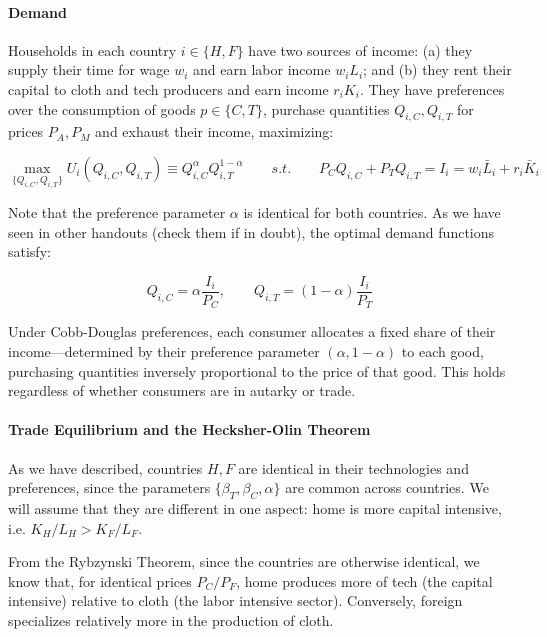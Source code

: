 \documentclass[11pt,letterpaper]{article}
\begin{document}
\paragraph{Demand} Households in each country $i \in \{H,F\}$ have two sources of income: (a) they supply their time for wage $w_i$ and earn labor income $w_i L_i$; and (b) they rent their capital to cloth and tech producers and earn income $r_{i} K_{i}$. They have preferences over the consumption of goods $p \in \{ C, T\}$, purchase quantities $Q_{i,C}, Q_{i,T}$ for prices $P_{A}, P_{M}$ and exhaust their income, maximizing:

\begin{equation*}
    \max_{\{Q_{i,C}, Q_{i,T}\}} U_i(Q_{i,C}, Q_{i,T}) \equiv Q_{i,C}^{\alpha} Q_{i,T}^{1-\alpha} \qquad s.t. \qquad P_{C} Q_{i,C} + P_{T} Q_{i,T} = I_i = w_i \bar{L}_i + r_{i} \bar{K}_{i}
\end{equation*}

Note that the preference parameter $\alpha$ is identical for both countries. As we have seen in other handouts (check them if in doubt), the optimal demand functions satisfy:

\begin{equation}\label{eq: demand}
    Q_{i,C} = \alpha  \frac{I_i}{P_{C}}, \qquad Q_{i,T} = (1-\alpha) \frac{I_i}{P_{T}}
\end{equation}
\normalsize

Under Cobb-Douglas preferences, each consumer allocates a fixed share of their income—determined by their preference parameter $(\alpha, 1-\alpha)$ to each good, purchasing quantities inversely proportional to the price of that good. This holds regardless of whether consumers are in autarky or trade.


\paragraph{Trade Equilibrium and the Hecksher-Olin Theorem} As we have described, countries $H,F$ are identical in their technologies and preferences, since the parameters $\{\beta_T, \beta_C,\alpha\}$ are common across countries.  We will assume that they are different in one aspect: home is more capital intensive, i.e. $K_H/L_H > K_F/L_F$.

From the Rybzynski Theorem, since the countries are otherwise identical, we know that, for identical prices $P_C/P_F$, home produces more of tech (the capital intensive) relative to cloth (the labor intensive sector). Conversely, foreign specializes relatively more in the production of cloth.
\end{document}
